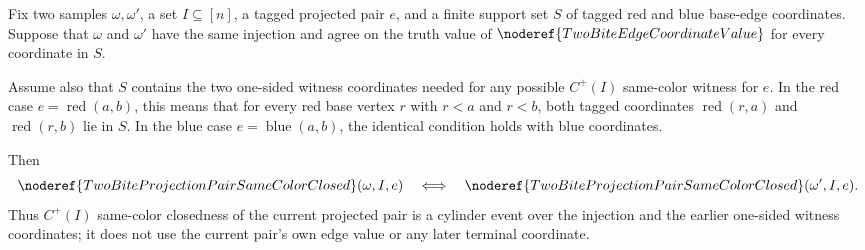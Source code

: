 \begin{helper}
Fix two samples \(\omega,\omega'\), a set \(I\subseteq[n]\), a tagged
projected pair \(e\), and a finite support set \(S\) of tagged red and blue
base-edge coordinates.  Suppose that \(\omega\) and \(\omega'\) have the
same injection and agree on the truth value of
\(\noderef{TwoBiteEdgeCoordinateValue}\) for every coordinate in \(S\).

Assume also that \(S\) contains the two one-sided witness coordinates needed
for any possible \(C^+(I)\) same-color witness for \(e\).  In the red case
\(e=\operatorname{red}(a,b)\), this means that for every red base vertex
\(r\) with \(r<a\) and \(r<b\), both tagged coordinates
\(\operatorname{red}(r,a)\) and \(\operatorname{red}(r,b)\) lie in \(S\).
In the blue case \(e=\operatorname{blue}(a,b)\), the identical condition
holds with blue coordinates.

Then
\[
\noderef{TwoBiteProjectionPairSameColorClosed}(\omega,I,e)
\quad\Longleftrightarrow\quad
\noderef{TwoBiteProjectionPairSameColorClosed}(\omega',I,e).
\]
Thus \(C^+(I)\) same-color closedness of the current projected pair is a
cylinder event over the injection and the earlier one-sided witness
coordinates; it does not use the current pair's own edge value or any later
terminal coordinate.
\end{helper}

